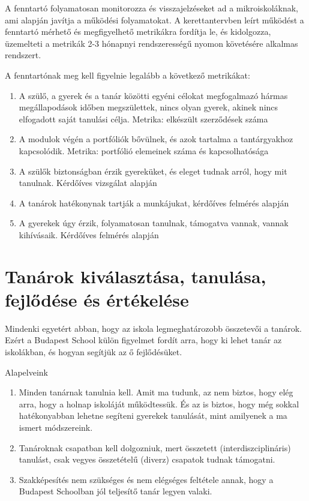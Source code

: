 A fenntartó folyamatosan monitorozza és visszajelzéseket ad a mikroiskoláknak, ami alapján javítja a működési folyamatokat. A kerettantervben leírt működést a fenntartó mérhető és megfigyelhető metrikákra fordítja le, és kidolgozza, üzemelteti a metrikák 2-3 hónapnyi rendszerességű nyomon követésére alkalmas rendszert.

A fenntartónak meg kell figyelnie legalább a következő metrikákat:
\begin{enumerate}
\item A szülő, a gyerek és a tanár közötti egyéni célokat megfogalmazó hármas megállapodások időben megszülettek, nincs olyan gyerek, akinek nincs elfogadott saját tanulási célja. Metrika: elkészült szerződések száma

\item A modulok végén a portfóliók bővülnek, és azok tartalma a tantárgyakhoz kapcsolódik. Metrika: portfólió elemeinek száma és kapcsolhatósága

\item A szülők biztonságban érzik gyereküket, és eleget tudnak arról, hogy mit tanulnak. Kérdőíves vizsgálat alapján

\item A tanárok hatékonynak tartják a munkájukat, kérdőíves felmérés alapján

\item A gyerekek úgy érzik, folyamatosan tanulnak, támogatva vannak, vannak kihívásaik. Kérdőíves felmérés alapján
\end{enumerate}

\section{Tanárok kiválasztása, tanulása, fejlődése és értékelése}

Mindenki egyetért abban, hogy az iskola legmeghatározobb összetevői a tanárok. Ezért a Budapest School külön figyelmet fordít arra, hogy ki lehet tanár az iskolákban, és hogyan segítjük az ő fejlődésüket.

Alapelveink
\begin{enumerate}
\item Minden tanárnak tanulnia kell. Amit ma tudunk, az nem biztos, hogy elég arra, hogy a holnap iskoláját működtessük. És az is biztos, hogy még sokkal hatékonyabban lehetne segíteni gyerekek tanulását, mint amilyenek a ma ismert módszereink.

\item Tanároknak csapatban kell dolgozniuk, mert összetett (interdiszciplináris) tanulást, csak vegyes összetételű (diverz) csapatok tudnak támogatni.

\item Szakképesítés nem szükséges és nem elégséges feltétele annak, hogy a Budapest Schoolban jól teljesítő tanár legyen valaki.
\end{enumerate}
